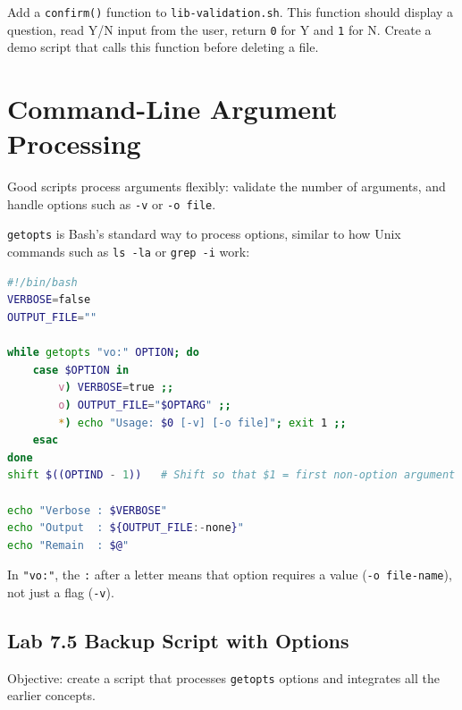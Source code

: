 \begin{exercisebox}[Exercise 9.4]
Add a \texttt{confirm()} function to \texttt{lib-validation.sh}. This
function should display a question, read Y/N input from the user, return
\texttt{0} for Y and \texttt{1} for N. Create a demo script that calls this
function before deleting a file.
\end{exercisebox}

\section{Command-Line Argument Processing}
\label{sec:argument-processing}

Good scripts process arguments flexibly: validate the number of arguments, and
handle options such as \texttt{-v} or \texttt{-o file}.

\texttt{getopts} is Bash's standard way to process options, similar to how
Unix commands such as \texttt{ls -la} or \texttt{grep -i} work:

\begin{lstlisting}[language=bash, caption={Basic getopts pattern}]
#!/bin/bash
VERBOSE=false
OUTPUT_FILE=""

while getopts "vo:" OPTION; do
    case $OPTION in
        v) VERBOSE=true ;;
        o) OUTPUT_FILE="$OPTARG" ;;
        *) echo "Usage: $0 [-v] [-o file]"; exit 1 ;;
    esac
done
shift $((OPTIND - 1))   # Shift so that $1 = first non-option argument

echo "Verbose : $VERBOSE"
echo "Output  : ${OUTPUT_FILE:-none}"
echo "Remain  : $@"
\end{lstlisting}

In \texttt{"vo:"}, the \texttt{:} after a letter means that option requires
a value (\texttt{-o file-name}), not just a flag (\texttt{-v}).

\subsection*{Lab 7.5 Backup Script with Options}

Objective: create a script that processes \texttt{getopts} options and
integrates all the earlier concepts.

